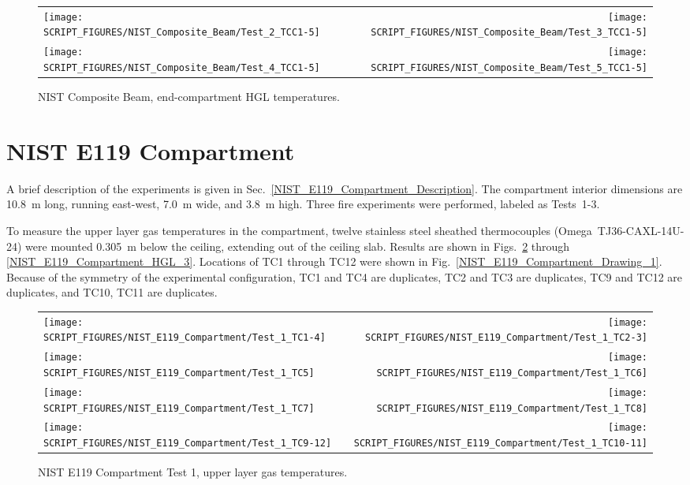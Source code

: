 \begin{figure}[p]
\begin{tabular*}{\textwidth}{l@{\extracolsep{\fill}}r}
\texttt{[image: SCRIPT\_FIGURES/NIST\_Composite\_Beam/Test\_2\_TCC1-5]} &
\texttt{[image: SCRIPT\_FIGURES/NIST\_Composite\_Beam/Test\_3\_TCC1-5]} \\
\texttt{[image: SCRIPT\_FIGURES/NIST\_Composite\_Beam/Test\_4\_TCC1-5]} &
\texttt{[image: SCRIPT\_FIGURES/NIST\_Composite\_Beam/Test\_5\_TCC1-5]}
\end{tabular*}
\caption[NIST Composite Beam, end-compartment HGL temperatures]
{NIST Composite Beam, end-compartment HGL temperatures.}
\label{NIST_CB_HGL_2}
\end{figure}

\clearpage

\section{NIST E119 Compartment}

A brief description of the experiments is given in Sec.~\ref{NIST_E119_Compartment_Description}. The compartment interior dimensions are 10.8~m long, running east-west, 7.0~m wide, and 3.8~m high. Three fire experiments were performed, labeled as Tests~1-3.

To measure the upper layer gas temperatures in the compartment, twelve stainless steel sheathed thermocouples (Omega~TJ36-CAXL-14U-24) were mounted 0.305~m below the ceiling, extending out of the ceiling slab. Results are shown in Figs.~\ref{NIST_E119_Compartment_HGL_1} through \ref{NIST_E119_Compartment_HGL_3}. Locations of TC1 through TC12 were shown in Fig.~\ref{NIST_E119_Compartment_Drawing_1}. Because of the symmetry of the experimental configuration, TC1 and TC4 are duplicates, TC2 and TC3 are duplicates, TC9 and TC12 are duplicates, and TC10, TC11 are duplicates.

\newpage

\begin{figure}[p]
\begin{tabular*}{\textwidth}{l@{\extracolsep{\fill}}r}
\texttt{[image: SCRIPT\_FIGURES/NIST\_E119\_Compartment/Test\_1\_TC1-4]} &
\texttt{[image: SCRIPT\_FIGURES/NIST\_E119\_Compartment/Test\_1\_TC2-3]} \\
\texttt{[image: SCRIPT\_FIGURES/NIST\_E119\_Compartment/Test\_1\_TC5]} &
\texttt{[image: SCRIPT\_FIGURES/NIST\_E119\_Compartment/Test\_1\_TC6]} \\
\texttt{[image: SCRIPT\_FIGURES/NIST\_E119\_Compartment/Test\_1\_TC7]} &
\texttt{[image: SCRIPT\_FIGURES/NIST\_E119\_Compartment/Test\_1\_TC8]} \\
\texttt{[image: SCRIPT\_FIGURES/NIST\_E119\_Compartment/Test\_1\_TC9-12]} &
\texttt{[image: SCRIPT\_FIGURES/NIST\_E119\_Compartment/Test\_1\_TC10-11]}
\end{tabular*}
\caption[NIST E119 Compartment Test 1, upper layer gas temperatures temperatures]
{NIST E119 Compartment Test 1, upper layer gas temperatures.}
\label{NIST_E119_Compartment_HGL_1}
\end{figure}

